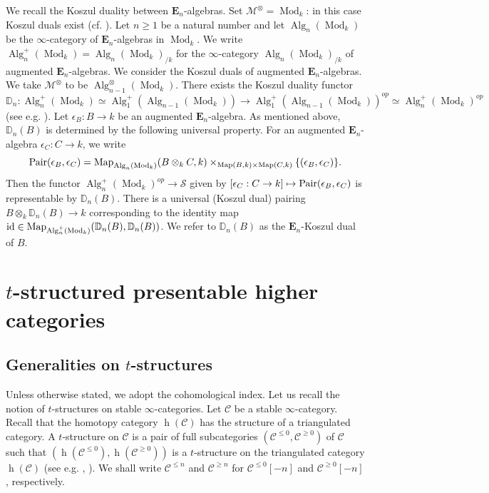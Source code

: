 \documentclass[leqno,12pt]{amsart}
\theoremstyle{plain}
\theoremstyle{definition}
\newcommand{\DD}{\mathbb{D}}
\newcommand{\CCC}{\mathcal{C}}
\newcommand{\MMM}{\mathcal{M}}
\newcommand{\Mod}{\operatorname{Mod}}
\newcommand{\SSS}{\mathcal{S}}
\newcommand{\Map}{\operatorname{Map}}
\newcommand{\Alg}{\operatorname{Alg}}
\newcommand{\hhh}{\operatorname{h}}
\newcommand{\eenu}{\mathbf{E}_n}
\begin{document}
We recall the Koszul duality between $\eenu$-algebras. Set $\MMM^\otimes =\Mod_k$: in this case
Koszul duals exist (cf. \cite[X, 3.1.5, 4.3.8, 4.4.8]{DAG}).
Let $n\ge1$ be a natural number and  let $\Alg_{n}(\Mod_k)$ be the $\infty$-category of $\eenu$-algebras in $\Mod_k$.
We write $\Alg^+_{n}(\Mod_k)=\Alg_n(\Mod_k)_{/k}$ for the $\infty$-category
$\Alg_{n}(\Mod_k)_{/k}$ of augmented $\eenu$-algebras.
We consider the Koszul duals of augmented $\eenu$-algebras.
We take $\MMM^\otimes$ to be $\Alg_{n-1}^\otimes(\Mod_k)$. There exists the Koszul duality functor
\[
\DD_n:\Alg_{n}^+(\Mod_k)\simeq \Alg_1^+(\Alg_{n-1}(\Mod_k))\longrightarrow\Alg_1^+(\Alg_{n-1}(\Mod_k))^{op}\simeq  \Alg_{n}^+(\Mod_k)^{op}
\]
(see e.g. \cite[X, 4.4.8]{DAG}).
Let $\epsilon_{B}:B\to k$ be an augmented $\eenu$-algebra.
As mentioned above,
$\DD_n(B)$ is determined by the following universal property.
For an augmented $\eenu$-algebra $\epsilon_C:C\to k$, we write
\[
\textup{Pair}(\epsilon_B,\epsilon_C)= \Map_{\Alg_{n}(\Mod_k)}(B\otimes_k C,k)\times_{\Map(B,k)\times\Map(C,k)}\{(\epsilon_B,\epsilon_C)\}.
\]
Then the functor $\Alg^+_{n}(\Mod_k)^{op}\to \SSS$ given by $[\epsilon_C:C\to k]\mapsto \textup{Pair}(\epsilon_B,\epsilon_C)$
is representable by $\DD_{n}(B)$.
There is a universal (Koszul dual) pairing $B\otimes_k\DD_{n}(B)\to k$ corresponding to
the identity map $\textup{id}\in \Map_{\Alg^+_{n}(\Mod_k)}(\DD_{n}(B),\DD_{n}(B))$.
We refer to $\DD_{n}(B)$ as the $\eenu$-Koszul dual of $B$. 











\section{$t$-structured presentable higher categories}


\label{TPHCsec}

\subsection{Generalities on $t$-structures}

\label{tsec}

Unless otherwise stated, we adopt the cohomological index.
Let us recall the notion of $t$-structures on stable $\infty$-categories.
Let $\CCC$ be a stable $\infty$-category.
Recall that the homotopy category $\hhh(\CCC)$ has the structure of a triangulated category.
A $t$-structure on $\CCC$ is a pair of full subcategories $(\CCC^{\le0},\CCC^{\ge0})$ of $\CCC$
such that $(\hhh(\CCC^{\le0}), \hhh(\CCC^{\ge0}))$ is a $t$-structure on the triangulated category $\hhh(\CCC)$ (see e.g. \cite{HA}, \cite[Section 2.1]{IH}).
We shall write $\CCC^{\le n}$ and $\CCC^{\ge n}$ for $\CCC^{\le 0}[-n]$ and $\CCC^{\ge 0}[-n]$, respectively.
\end{document}
